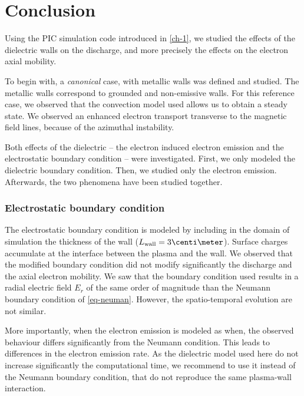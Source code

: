 
\section{Conclusion}
  \label{sec-conclusion_ch2}
  
  Using the \ac{PIC} simulation code introduced in \cref{ch-1}, we studied the effects of the dielectric walls on the discharge, and more precisely the effects on the electron axial mobility.
  
  To begin with, a \emph{canonical} case, with metallic walls was defined and studied.
  The metallic walls correspond to grounded and non-emissive walls.
  For this reference case, we observed that the convection model used allows us to obtain a steady state.
  We observed an enhanced electron transport transverse to the magnetic field lines, because of the azimuthal instability.
  
  Both effects of the dielectric -- the electron induced electron emission and the electrostatic boundary condition -- were investigated.
  First, we  only modeled the dielectric boundary condition. Then, we studied only the electron emission. Afterwards, the two phenomena have been studied together.
  
  \subsubsection*{Electrostatic boundary condition}
  
  The electrostatic boundary condition is modeled by including in the domain of simulation the thickness of the wall ($L_{\rm wall} = 3 \centi\meter$).
  Surface charges accumulate at the interface between the plasma and the wall.
  We observed that the modified boundary condition did not modify significantly the discharge and the axial electron mobility.
  We saw that the boundary condition used results in a radial electric field $E_r$ of the same order of magnitude than the Neumann boundary condition of \cref{eq-neuman}.
  However, the spatio-temporal evolution are not similar.
  
  More importantly, when the electron emission is modeled as when, the observed behaviour differs significantly from the Neumann condition.
  This leads to differences in the electron emission rate.
  As the dielectric model used here do not increase significantly the computational time, we recommend to use it instead of the Neumann boundary condition, that do not reproduce the same plasma-wall interaction.
  
